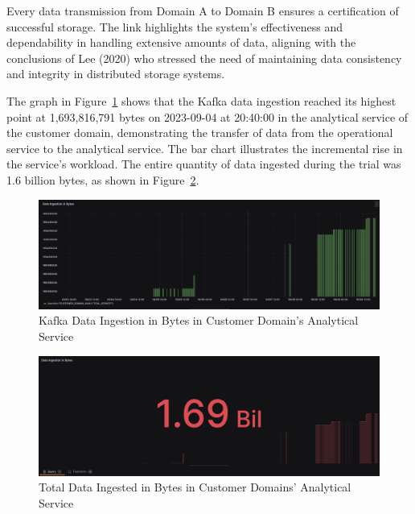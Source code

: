 \documentclass[preprint,12pt]{elsarticle}
\begin{document}
Every data transmission from Domain A to Domain B ensures a certification of successful storage. The link highlights the system's effectiveness and dependability in handling extensive amounts of data, aligning with the conclusions of Lee (2020) who stressed the need of maintaining data consistency and integrity in distributed storage systems. 

The graph in Figure~\ref{kafkIngestionInBytesInCustomerDomainAnalyticalService} shows that the Kafka data ingestion reached its highest point at 1,693,816,791 bytes on 2023-09-04 at 20:40:00 in the analytical service of the customer domain, demonstrating the transfer of data from the operational service to the analytical service. The bar chart illustrates the incremental rise in the service's workload.  The entire quantity of data ingested during the trial was 1.6 billion bytes, as shown in Figure~\ref{totalDataIngestedinBytesInCustomerDomainsAnalyticalService}.


\begin{figure}[h!]
  \centering
  \includegraphics[width=\textwidth]{images/Kafka-ingestion-in-Bytes.png}
  \caption{Kafka Data Ingestion in Bytes in Customer Domain's Analytical Service}
  \label{kafkIngestionInBytesInCustomerDomainAnalyticalService}
\end{figure}

\begin{figure}[h!]
  \centering
  \includegraphics[width=\textwidth]{images/total-data-ingested-in-bytes.jpeg}
  \caption{Total Data Ingested in Bytes in Customer Domains' Analytical Service}
  \label{totalDataIngestedinBytesInCustomerDomainsAnalyticalService}
\end{figure}
\end{document}
